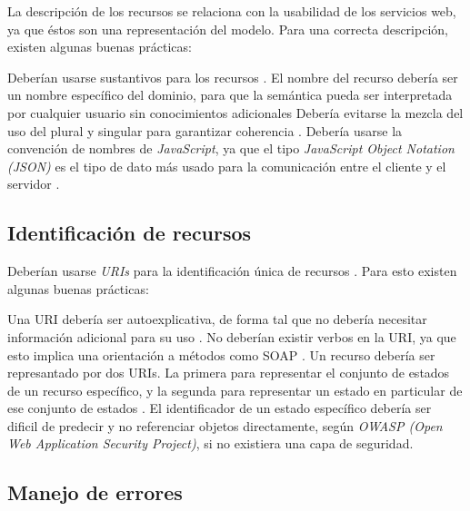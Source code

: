 La descripción de los recursos se relaciona con la usabilidad de los servicios web, ya que éstos son una representación del modelo. Para una correcta descripción, existen algunas buenas prácticas:
\begin{outline}
    \1 Deberían usarse sustantivos para los recursos \cite{WAPID}.
    \1 El nombre del recurso debería ser un nombre específico del dominio, para que la semántica pueda ser interpretada por cualquier usuario sin conocimientos adicionales \cite{WAPID}
    \1 Debería evitarse la mezcla del uso del plural y singular para garantizar coherencia \cite{WAPID}.
    \1 Debería usarse la convención de nombres de \textit{JavaScript}, ya que el tipo \textit{JavaScript Object Notation (JSON)} es el tipo de dato más usado para la comunicación entre el cliente y el servidor \cite{WAPID}.
\end{outline}
\subsection[Identificación de recursos]{Identificación de recursos}

Deberían usarse \textit{URIs} para la identificación única de recursos \cite{ASDNB}. Para esto existen algunas buenas prácticas:
\begin{outline}
    \1 Una URI debería ser autoexplicativa, de forma tal que no debería necesitar información adicional para su uso \cite{WAPID}.
    \1 No deberían existir verbos en la URI, ya que esto implica una orientación a métodos como SOAP \cite{WAPID}.
    \1 Un recurso debería ser represantado por dos URIs. La primera para representar el conjunto de estados de un recurso específico, y la segunda para representar un estado en particular de ese conjunto de estados \cite{WAPID}.
    \1 El identificador de un estado específico debería ser dificil de predecir y no referenciar objetos directamente, según \textit{OWASP (Open Web Application Security Project)}, si no existiera una capa de seguridad.
\end{outline}

\subsection[Manejo de errores]{Manejo de errores}

